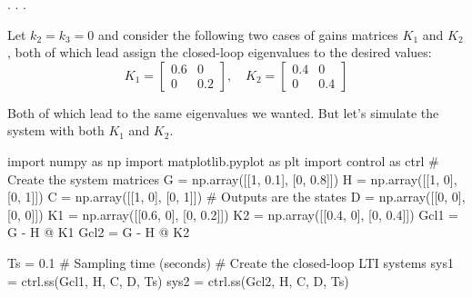 \documentclass[
  letterpaper,
  DIV=11,
  numbers=noendperiod,
  oneside]{scrartcl}
\newenvironment{Shaded}{\begin{snugshade}}{\end{snugshade}}
\newcommand{\CommentTok}[1]{\textcolor[rgb]{0.37,0.37,0.37}{#1}}
\newcommand{\DecValTok}[1]{\textcolor[rgb]{0.68,0.00,0.00}{#1}}
\newcommand{\FloatTok}[1]{\textcolor[rgb]{0.68,0.00,0.00}{#1}}
\newcommand{\ImportTok}[1]{\textcolor[rgb]{0.00,0.46,0.62}{#1}}
\newcommand{\NormalTok}[1]{\textcolor[rgb]{0.00,0.23,0.31}{#1}}
\newcommand{\OperatorTok}[1]{\textcolor[rgb]{0.37,0.37,0.37}{#1}}
\begin{document}
. . .

Let \(k_2 = k_3 = 0\) and consider the following two cases of gains
matrices \(K_1\) and \(K_2\), both of which lead assign the closed-loop
eigenvalues to the desired values: \[
K_1 = \begin{bmatrix} 0.6 & 0 \\ 0 & 0.2 \end{bmatrix}, \quad K_2 = \begin{bmatrix} 0.4 & 0 \\ 0 & 0.4 \end{bmatrix}
\]

Both of which lead to the same eigenvalues we wanted. But let's simulate
the system with both \(K_1\) and \(K_2\).

\begin{Shaded}
\begin{Highlighting}[numbers=left,,]
\ImportTok{import}\NormalTok{ numpy }\ImportTok{as}\NormalTok{ np}
\ImportTok{import}\NormalTok{ matplotlib.pyplot }\ImportTok{as}\NormalTok{ plt}
\ImportTok{import}\NormalTok{ control }\ImportTok{as}\NormalTok{ ctrl}
\CommentTok{\# Create the system matrices}
\NormalTok{G }\OperatorTok{=}\NormalTok{ np.array([[}\DecValTok{1}\NormalTok{, }\FloatTok{0.1}\NormalTok{], [}\DecValTok{0}\NormalTok{, }\FloatTok{0.8}\NormalTok{]])}
\NormalTok{H }\OperatorTok{=}\NormalTok{ np.array([[}\DecValTok{1}\NormalTok{, }\DecValTok{0}\NormalTok{], [}\DecValTok{0}\NormalTok{, }\DecValTok{1}\NormalTok{]])}
\NormalTok{C }\OperatorTok{=}\NormalTok{ np.array([[}\DecValTok{1}\NormalTok{, }\DecValTok{0}\NormalTok{], [}\DecValTok{0}\NormalTok{, }\DecValTok{1}\NormalTok{]]) }\CommentTok{\# Outputs are the states}
\NormalTok{D }\OperatorTok{=}\NormalTok{ np.array([[}\DecValTok{0}\NormalTok{, }\DecValTok{0}\NormalTok{], [}\DecValTok{0}\NormalTok{, }\DecValTok{0}\NormalTok{]])}
\NormalTok{K1 }\OperatorTok{=}\NormalTok{ np.array([[}\FloatTok{0.6}\NormalTok{, }\DecValTok{0}\NormalTok{], [}\DecValTok{0}\NormalTok{, }\FloatTok{0.2}\NormalTok{]]) }
\NormalTok{K2 }\OperatorTok{=}\NormalTok{ np.array([[}\FloatTok{0.4}\NormalTok{, }\DecValTok{0}\NormalTok{], [}\DecValTok{0}\NormalTok{, }\FloatTok{0.4}\NormalTok{]]) }
\NormalTok{Gcl1 }\OperatorTok{=}\NormalTok{ G }\OperatorTok{{-}}\NormalTok{ H }\OperatorTok{@}\NormalTok{ K1 }
\NormalTok{Gcl2 }\OperatorTok{=}\NormalTok{ G }\OperatorTok{{-}}\NormalTok{ H }\OperatorTok{@}\NormalTok{ K2}

\NormalTok{Ts }\OperatorTok{=} \FloatTok{0.1} \CommentTok{\# Sampling time (seconds)}
\CommentTok{\# Create the closed{-}loop LTI systems}
\NormalTok{sys1 }\OperatorTok{=}\NormalTok{ ctrl.ss(Gcl1, H, C, D, Ts) }
\NormalTok{sys2 }\OperatorTok{=}\NormalTok{ ctrl.ss(Gcl2, H, C, D, Ts) }


\end{Highlighting}
\end{Shaded}
\end{document}
